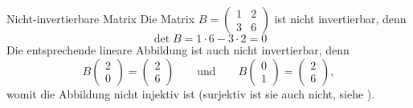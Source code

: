 \begin{bsp}
    {Nicht-invertierbare Matrix}{}
    Die Matrix $B=\begin{pmatrix}
        1&2 \\3&6
    \end{pmatrix}$ ist nicht invertierbar, denn
    $$\det B = 1\cdot 6 - 3\cdot 2 = 0$$
    Die entsprechende lineare Abbildung ist auch nicht invertierbar, denn
    $$ B\begin{pmatrix}
        2 \\0 
    \end{pmatrix}  = \begin{pmatrix}
        2 \\6
    \end{pmatrix} \qquad \text{und} \qquad B\begin{pmatrix}
        0 \\1 
    \end{pmatrix} = \begin{pmatrix}
        2 \\6
    \end{pmatrix},$$
    womit die Abbildung nicht injektiv ist (surjektiv ist sie auch nicht, siehe ). 
\end{bsp}
\pagebreak
